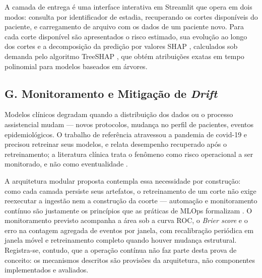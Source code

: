 \documentclass{ieeeaccess}
\begin{document}
A camada de entrega é uma interface interativa em Streamlit que opera em dois modos: consulta por identificador de estadia, recuperando os cortes disponíveis do paciente, e carregamento de arquivo com os dados de um paciente novo. Para cada corte disponível são apresentados o risco estimado, sua evolução ao longo dos cortes e a decomposição da predição por valores SHAP \cite{Lundberg2017}, calculados sob demanda pelo algoritmo TreeSHAP \cite{Lundberg2020}, que obtém atribuições exatas em tempo polinomial para modelos baseados em árvores.

\subsection*{G. Monitoramento e Mitigação de \textit{Drift}}
Modelos clínicos degradam quando a distribuição dos dados ou o processo assistencial mudam --- novos protocolos, mudança no perfil de pacientes, eventos epidemiológicos. O trabalho de referência \cite{King2022} atravessou a pandemia de covid-19 e precisou retreinar seus modelos, e relata desempenho recuperado após o retreinamento; a literatura clínica trata o fenômeno como risco operacional a ser monitorado, e não como eventualidade \cite{Finlayson2021}.

A arquitetura modular proposta contempla essa necessidade por construção: como cada camada persiste seus artefatos, o retreinamento de um corte não exige reexecutar a ingestão nem a construção da coorte --- automação e monitoramento contínuo são justamente os princípios que as práticas de MLOps formalizam \cite{Kreuzberger2023}. O monitoramento previsto acompanha a área sob a curva ROC, o \textit{Brier score} e o erro na contagem agregada de eventos por janela, com recalibração periódica em janela móvel e retreinamento completo quando houver mudança estrutural. Registra-se, contudo, que a operação contínua não faz parte desta prova de conceito: os mecanismos descritos são provisões da arquitetura, não componentes implementados e avaliados.
\end{document}
